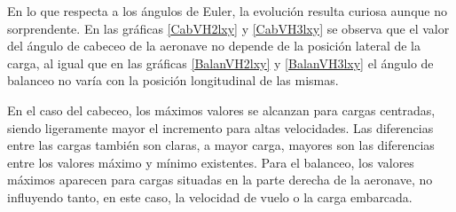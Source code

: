 En lo que respecta a los ángulos de Euler, la evolución resulta curiosa aunque no sorprendente. En las gráficas \ref{CabVH2lxy} y \ref{CabVH3lxy} se observa que el valor del ángulo de cabeceo de la aeronave no depende de la posición lateral de la carga, al igual que en las gráficas \ref{BalanVH2lxy} y \ref{BalanVH3lxy} el ángulo de balanceo no varía con la posición longitudinal de las mismas.

En el caso del cabeceo, los máximos valores se alcanzan para cargas centradas, siendo ligeramente mayor el incremento para altas velocidades. Las diferencias entre las cargas también son claras, a mayor carga, mayores son las diferencias entre los valores máximo y mínimo existentes. Para el balanceo, los valores máximos aparecen para cargas situadas en la parte derecha de la aeronave, no influyendo tanto, en este caso, la velocidad de vuelo o la carga embarcada.

